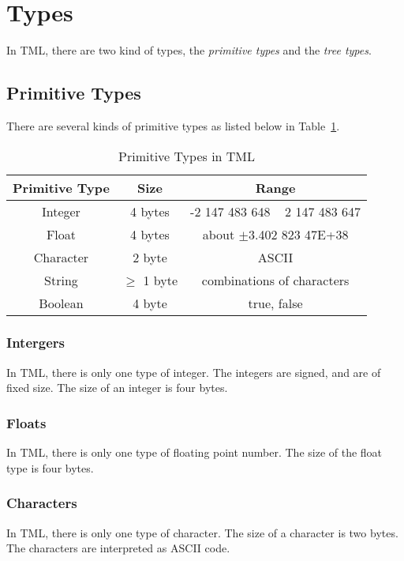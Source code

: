 \documentclass[12pt,psfig,a4]{article}
\begin{document}
\section {Types}
In TML, there are two kind of types, the \textit{primitive types} and the \textit{tree types}.

\subsection {Primitive Types}
There are several kinds of primitive types as listed below in Table~\ref{pri_types}. 

\begin{table}[!ht]
\begin{center}
\begin{tabular}{| c | c | c |}
\hline
\textbf{Primitive Type} & \textbf{Size} & \textbf{Range} \\
\hline
Integer & 4 bytes & -2 147 483 648 ~  2 147 483 647 \\
\hline
Float & 4 bytes & about $\pm$3.402 823 47E+38\\
\hline
Character & 2 byte &  ASCII\\  %
\hline
String & $\geq$ 1 byte & combinations of characters \\
\hline
Boolean & 4 byte & true, false \\
\hline
\end{tabular}
\caption{Primitive Types in TML}
\label{pri_types}
\end {center}
\end{table}

\subsubsection {Intergers}
In TML, there is only one type of integer. The integers are signed, and are of fixed size. The size of an integer is four bytes.

\subsubsection {Floats}
In TML, there is only one type of floating point number. The size of the float type is four bytes.

\subsubsection {Characters}
In TML, there is only one type of character. The size of a character is two bytes. The characters are interpreted as ASCII code.
\end{document}
